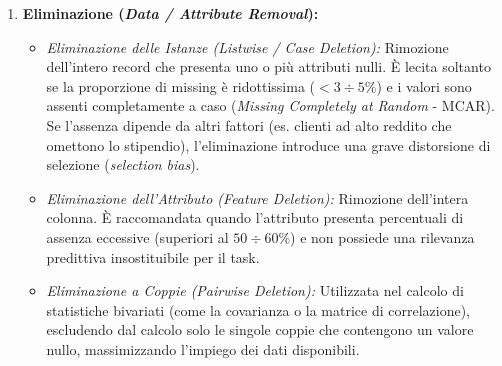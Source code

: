 \begin{enumerate}
    \item \textbf{Eliminazione (\textit{Data / Attribute Removal}):}
    \begin{itemize}
        \item \textit{Eliminazione delle Istanze (Listwise / Case Deletion):} Rimozione dell'intero record che presenta uno o più attributi nulli. È lecita soltanto se la proporzione di missing è ridottissima ($< 3\div 5\%$) e i valori sono assenti completamente a caso (\textit{Missing Completely at Random} - MCAR). Se l'assenza dipende da altri fattori (es. clienti ad alto reddito che omettono lo stipendio), l'eliminazione introduce una grave distorsione di selezione (\textit{selection bias}).
        \item \textit{Eliminazione dell'Attributo (Feature Deletion):} Rimozione dell'intera colonna. È raccomandata quando l'attributo presenta percentuali di assenza eccessive (superiori al $50\div 60\%$) e non possiede una rilevanza predittiva insostituibile per il task.
        \item \textit{Eliminazione a Coppie (Pairwise Deletion):} Utilizzata nel calcolo di statistiche bivariati (come la covarianza o la matrice di correlazione), escludendo dal calcolo solo le singole coppie che contengono un valore nullo, massimizzando l'impiego dei dati disponibili.
    \end{itemize}


\end{enumerate}
